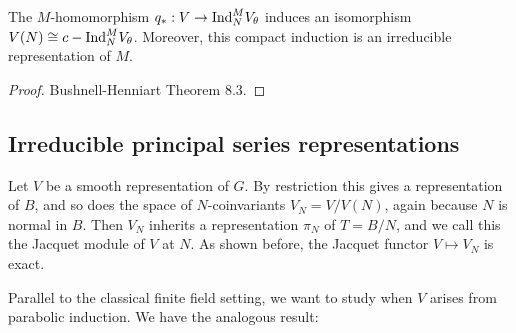 \begin{thm}\label{mirabolic}
    The $M$-homomorphism $q_*: V \to \mathrm{Ind}_N^M V_\theta$ induces an isomorphism $V(N) \cong c-\mathrm{Ind}_N^M V_\theta$. Moreover, this compact induction is an irreducible representation of $M$.
\end{thm}
\begin{proof}
    Bushnell-Henniart Theorem 8.3.
\end{proof}




\subsection{Irreducible principal series representations}

Let $V$ be a smooth representation of $G$. By restriction this gives a representation of $B$, and so does the space of $N$-coinvariants $V_N=V/V(N)$, again because $N$ is normal in $B$. Then $V_N$ inherits a representation $\pi_N$ of $T=B/N$, and we call this the Jacquet module of $V$ at $N$. As shown before, the Jacquet functor $V \mapsto V_N$ is exact.

Parallel to the classical finite field setting, we want to study when $V$ arises from parabolic induction. We have the analogous result:

